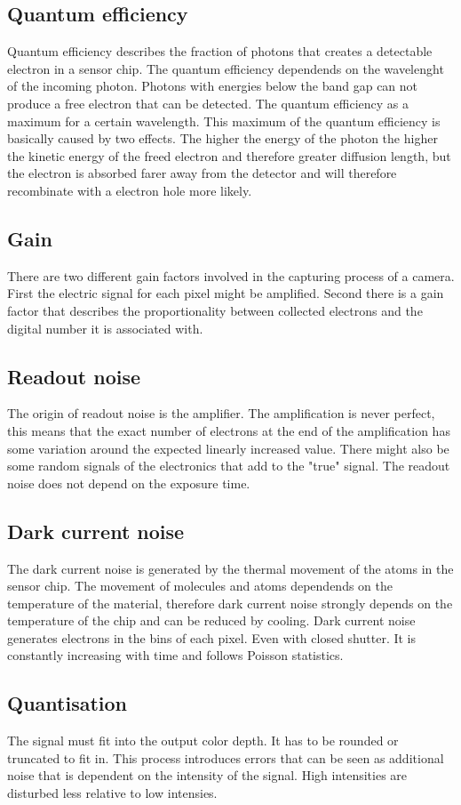 \subsection{Quantum efficiency}
Quantum efficiency describes the fraction of photons that creates a detectable electron in a sensor chip. The quantum efficiency dependends on the wavelenght of the incoming photon. Photons with energies below the band gap can not produce a free electron that can be detected. The quantum efficiency as a maximum for a certain wavelength. This maximum of the quantum efficiency is basically caused by two effects. The higher the energy of the photon the higher the kinetic energy of the freed electron and therefore greater diffusion length, but the electron is absorbed farer away from the detector and will therefore recombinate with a electron hole more likely.
\subsection{Gain}
There are two different gain factors involved in the capturing process of a camera. First the electric signal for each pixel might be amplified. Second there is a gain factor that describes the proportionality between collected electrons and the digital number it is associated with.
\subsection{Readout noise}
The origin of readout noise is the amplifier. The amplification is never perfect, this means that the exact number of electrons at the end of the amplification has some variation around the expected linearly increased value. There might also be some random signals of the electronics that add to the "true" signal. The readout noise does not depend on the exposure time.
\subsection{Dark current noise}
The dark current noise is generated by the thermal movement of the atoms in the sensor chip. The movement of molecules and atoms dependends on the temperature of the material, therefore dark current noise strongly depends on the temperature of the chip and can be reduced by cooling. Dark current noise generates electrons in the bins of each pixel. Even with closed shutter. It is constantly increasing with time and follows Poisson statistics.
\subsection{Quantisation}
The signal must fit into the output color depth. It has to be rounded or truncated to fit in. This process introduces errors that can be seen as additional noise that is dependent on the intensity of the signal. High intensities are disturbed less relative to low intensies.


